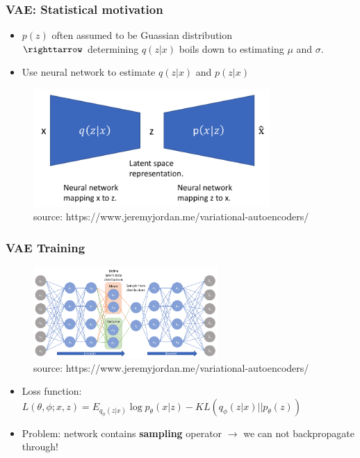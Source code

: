 
\begin{frame}
\frametitle{VAE: Statistical motivation}

\begin{itemize}
\item $p(z)$ often assumed to be Guassian distribution \\ $\righttarrow$ determining $q(z|x)$ boils down to estimating $\mu$ and $\sigma$.
\item Use neural network to estimate $q(z|x)$ and $p(z|x)$
\end{itemize}


                \begin{figure}
                \centering
                \includegraphics[width=9cm]{plots/vae.png}
                \vspace{-6pt}
                \caption{\tiny{source: https://www.jeremyjordan.me/variational-autoencoders/}}
                \end{figure}
                \vspace{-10pt}

\end{frame}


\begin{frame}
\frametitle{VAE Training}

                \begin{figure}
                \centering
                \includegraphics[width=7cm]{plots/vae_training.png}
                \vspace{-6pt}
                \caption{\tiny{source: https://www.jeremyjordan.me/variational-autoencoders/}}
                \end{figure}
  
  
\begin{itemize}
\item Loss function: $ L(\theta, \phi; x, z) = E_{q_{\phi} ({z|x})} \log p_{\theta} ({x|z}) - KL ({q_{\phi} ({z|x})|| p_{\theta} (z)})$
\item Problem: network contains \textbf{sampling} operator $\rightarrow$ we can not backpropagate through!
\end{itemize}              

\end{frame}

